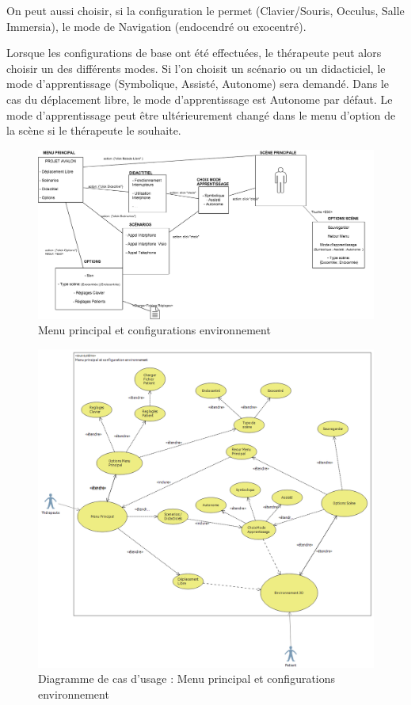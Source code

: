 On peut aussi choisir, si la configuration le permet (Clavier/Souris, Occulus, Salle Immersia), le mode de Navigation (endocendré ou exocentré).

Lorsque les configurations de base ont été effectuées, le thérapeute peut alors choisir un des différents modes. Si l'on choisit un scénario ou un didacticiel, le mode d'apprentissage (Symbolique, Assisté, Autonome) sera demandé. Dans le cas du déplacement libre, le mode d'apprentissage est Autonome par défaut. Le mode d'apprentissage peut être ultérieurement changé dans le menu d'option de la scène si le thérapeute le souhaite.
\newline

\begin{figure}[h]
\centering
\includegraphics[width=1\textwidth]{2-Specifications/img-utilisateur/menu.png}
\caption{\label{fig:Menu} Menu principal et configurations environnement }
\end{figure}
\begin{figure}[h]
\centering
\includegraphics[width=1\textwidth]{2-Specifications/img-utilisateur/cas-usage-menu.png}
\caption{\label{fig:CasUsageMenu} Diagramme de cas d'usage : Menu principal et configurations environnement }
\end{figure}
\FloatBarrier

